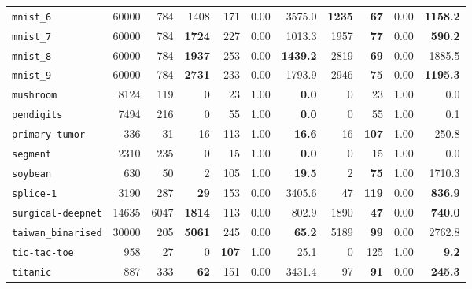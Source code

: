 \begin{tabular}{lccrrrrrrrr}
\texttt{mnist\_6} & \multicolumn{1}{r}{60000} & \multicolumn{1}{r}{784}  & 1408 & 171 & 0.00 & 3575.0 & \textbf{1235} & \textbf{67} & 0.00 & \textbf{1158.2}\\
\texttt{mnist\_7} & \multicolumn{1}{r}{60000} & \multicolumn{1}{r}{784}  & \textbf{1724} & 227 & 0.00 & 1013.3 & 1957 & \textbf{77} & 0.00 & \textbf{590.2}\\
\texttt{mnist\_8} & \multicolumn{1}{r}{60000} & \multicolumn{1}{r}{784}  & \textbf{1937} & 253 & 0.00 & \textbf{1439.2} & 2819 & \textbf{69} & 0.00 & 1885.5\\
\texttt{mnist\_9} & \multicolumn{1}{r}{60000} & \multicolumn{1}{r}{784}  & \textbf{2731} & 233 & 0.00 & 1793.9 & 2946 & \textbf{75} & 0.00 & \textbf{1195.3}\\
\texttt{mushroom} & \multicolumn{1}{r}{8124} & \multicolumn{1}{r}{119}  & 0 & 23 & 1.00 & \textbf{0.0} & 0 & 23 & 1.00 & 0.0\\
\texttt{pendigits} & \multicolumn{1}{r}{7494} & \multicolumn{1}{r}{216}  & 0 & 55 & 1.00 & \textbf{0.0} & 0 & 55 & 1.00 & 0.1\\
\texttt{primary-tumor} & \multicolumn{1}{r}{336} & \multicolumn{1}{r}{31}  & 16 & 113 & 1.00 & \textbf{16.6} & 16 & \textbf{107} & 1.00 & 250.8\\
\texttt{segment} & \multicolumn{1}{r}{2310} & \multicolumn{1}{r}{235}  & 0 & 15 & 1.00 & \textbf{0.0} & 0 & 15 & 1.00 & 0.0\\
\texttt{soybean} & \multicolumn{1}{r}{630} & \multicolumn{1}{r}{50}  & 2 & 105 & 1.00 & \textbf{19.5} & 2 & \textbf{75} & 1.00 & 1710.3\\
\texttt{splice-1} & \multicolumn{1}{r}{3190} & \multicolumn{1}{r}{287}  & \textbf{29} & 153 & 0.00 & 3405.6 & 47 & \textbf{119} & 0.00 & \textbf{836.9}\\
\texttt{surgical-deepnet} & \multicolumn{1}{r}{14635} & \multicolumn{1}{r}{6047}  & \textbf{1814} & 113 & 0.00 & 802.9 & 1890 & \textbf{47} & 0.00 & \textbf{740.0}\\
\texttt{taiwan\_binarised} & \multicolumn{1}{r}{30000} & \multicolumn{1}{r}{205}  & \textbf{5061} & 245 & 0.00 & \textbf{65.2} & 5189 & \textbf{99} & 0.00 & 2762.8\\
\texttt{tic-tac-toe} & \multicolumn{1}{r}{958} & \multicolumn{1}{r}{27}  & 0 & \textbf{107} & 1.00 & 25.1 & 0 & 125 & 1.00 & \textbf{9.2}\\
\texttt{titanic} & \multicolumn{1}{r}{887} & \multicolumn{1}{r}{333}  & \textbf{62} & 151 & 0.00 & 3431.4 & 97 & \textbf{91} & 0.00 & \textbf{245.3}\\

\end{tabular}
